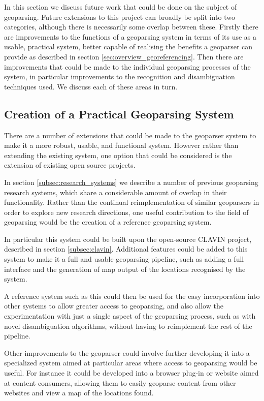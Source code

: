\documentclass[12pt, a4paper]{report}
\begin{document}
In this section we discuss future work that could be done on the subject of geoparsing. Future extensions to this project can broadly be split into two categories, although there is necessarily some overlap between these. Firstly there are improvements to the functions of a geoparsing system in terms of its use as a usable, practical system, better capable of realising the benefits a geoparser can provide as described in section \ref{sec:overview_georeferencing}. Then there are improvements that could be made to the individual geoparsing processes of the system, in particular improvements to the recognition and disambiguation techniques used. We discuss each of these areas in turn.

\subsection{Creation of a Practical Geoparsing System}
\label{subsec:creation_practical_geoparser}

There are a number of extensions that could be made to the geoparser system to make it a more robust, usable, and functional system. However rather than extending the existing system, one option that could be considered is the extension of existing open source projects.

In section \ref{subsec:research_systems} we describe a number of previous geoparsing research systems, which share a considerable amount of overlap in  their functionality. Rather than the continual reimplementation of similar geoparsers in order to explore new research directions, one useful contribution to the field of geoparsing would be the creation of a reference geoparsing system.

In particular this system could be built upon the open-source CLAVIN project, described in section \ref{subsec:clavin}. Additional features could be added to this system to make it a full and usable geoparsing pipeline, such as adding a full interface and the generation of map output of the locations recognised by the system. 

A reference system such as this could then be used for the easy incorporation into other systems to allow greater access to geoparsing, and also allow the experimentation with just a single aspect of the geoparsing process, such as with novel disambiguation algorithms, without having to reimplement the rest of the pipeline.

Other improvements to the geoparser could involve further developing it into a specialized system aimed at particular areas where access to geoparsing would be useful. For instance it could be developed into a browser plug-in or website aimed at content consumers, allowing them to easily geoparse content from other websites and view a map of the locations found.
\end{document}
